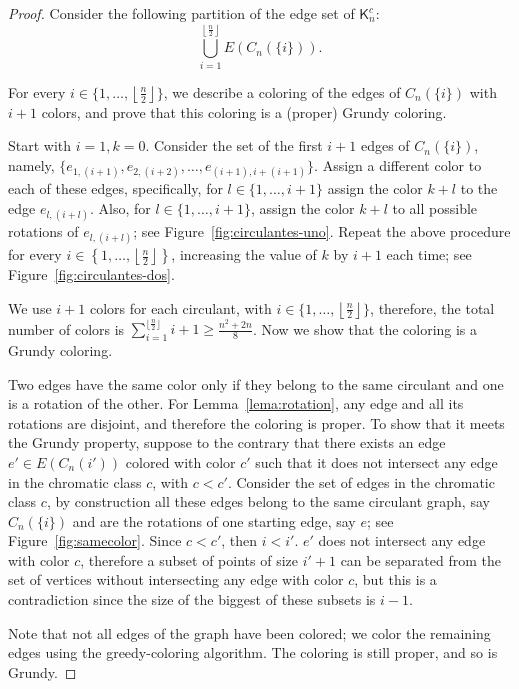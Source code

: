 \documentclass[11pt]{article}
\begin{document}
\begin{proof}

Consider the following partition of the edge set of $\mathsf{K}^c_n$: $$\bigcup_{i=1}^{\left \lfloor\frac{n}{2} \right \rfloor} E(C_n(\{i\})).$$

For every $i \in \{1, \ldots, \left \lfloor\frac{n}{2} \right \rfloor\}$, we describe a coloring of the edges of $C_n(\{i\})$ with $i+1$ colors, and prove that this coloring is a (proper) Grundy coloring. 

Start with $i=1, k = 0$. Consider the set of the first $i+1$ edges of $C_n(\{i\})$, namely, $\{e_{1,(i+1)}, e_{2,(i+2)}, \ldots, e_{(i+1), i+(i+1)}\}$. Assign a different color to each of these edges, specifically, for $l \in \{1, \ldots, i+1\}$ assign the color $k+l$ to the edge $e_{l, (i+l)}$. Also, for $l \in \{1, \ldots, i+1\}$, assign the color $k+l$ to all possible rotations of $e_{l, (i+l)}$; see Figure~\ref{fig:circulantes-uno}. Repeat the above procedure for every $i \in \left \{1, \ldots, \left \lfloor\frac{n}{2} \right \rfloor \right \}$, increasing the value of $k$ by $i+1$ each time; see Figure~\ref{fig:circulantes-dos}.

We use $i+1$ colors for each circulant, with $i \in \{1, \ldots, \left \lfloor\frac{n}{2} \right \rfloor\}$, therefore, the total number of colors is $\sum_{i=1}^{\lfloor\frac{n}{2}\rfloor} i+1\geq \frac{n^2+2n}{8}$. Now we show that the coloring is a Grundy coloring. 

Two edges have the same color only if they belong to the same circulant and one is a rotation of the other. For Lemma~\ref{lema:rotation}, any edge and all its rotations are disjoint, and therefore the coloring is proper. To show that it meets the Grundy property, suppose to the contrary that there exists an edge $e' \in E(C_n({i'}))$ colored with color $c'$ such that it does not intersect any edge in the chromatic class $c$, with $c < c'$. Consider the set of edges in the chromatic class $c$, by construction all these edges belong to the same circulant graph, say $C_n(\{i\})$ and are the rotations of one starting edge, say $e$; see Figure~\ref{fig:samecolor}. Since $c < c'$, then $i < i'$. $e'$ does not intersect any edge with color $c$, therefore a subset of points of size $i'+1$ can be separated from the set of vertices without intersecting any edge with color $c$, but this is a contradiction since the size of the biggest of these subsets is $i-1$.

Note that not all edges of the graph have been colored; we color the remaining edges using the greedy-coloring algorithm. The coloring is still proper, and so is Grundy.
\end{proof}
\end{document}
